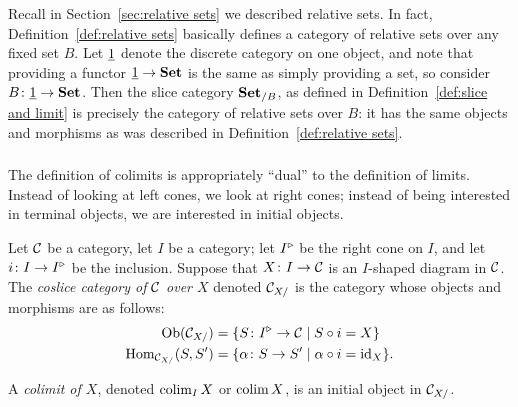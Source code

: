 \documentclass[CT4S-EN-RU]{subfiles}
\begin{document}
\begin{exampleRUS}\label{ex:product version of nat trans}
\end{exampleRUS}

\begin{remarkENG}
Recall in Section~\ref{sec:relative sets} we described relative sets. In fact, Definition~\ref{def:relative sets} basically defines a category of relative sets over any fixed set $B$. Let $\underline{1}$ denote the discrete category on one object, and note that providing a functor $\underline{1}\rightarrow{\mathbf{Set}}$ is the same as simply providing a set, so consider $B\colon\underline{1}\rightarrow{\mathbf{Set}}$. Then the slice category ${\mathbf{Set}}_{/B}$, as defined in Definition~\ref{def:slice and limit} is precisely the category of relative sets over $B$: it has the same objects and morphisms as was described in Definition~\ref{def:relative sets}.
\end{remarkENG}

\begin{remarkRUS}
\end{remarkRUS}


\subsubsection{}

\begin{blockENG}
The definition of colimits is appropriately “dual” to the definition of limits. Instead of looking at left cones, we look at right cones; instead of being interested in terminal objects, we are interested in initial objects.
\end{blockENG}

\begin{blockRUS}
\end{blockRUS}

\begin{definitionENG}\label{def:coslice and colimit}
Let $\mathcal{C}$ be a category, let $I$ be a category; let $I^\triangleright$ be the right cone on $I$, and let $i\colon I\rightarrow I^\triangleright$ be the inclusion. Suppose that $X\colon I\rightarrow\mathcal{C}$ is an $I$-shaped diagram in $\mathcal{C}$. The {\em coslice category of $\mathcal{C}$ over $X$} denoted $\mathcal{C}_{X/}$ is the category whose objects and morphisms are as follows:
\begin{align*}
\textnormal{Ob}(\mathcal{C}_{X/})&=\{S\colon I^\triangleright\rightarrow\mathcal{C}{\;|\;}S\circ i=X\}\\
\textnormal{Hom}_{\mathcal{C}_{X/}}(S,S')&=\{\alpha\colon S\rightarrow S'{\;|\;}\alpha\circ i=\textnormal{id}_X\}.
\end{align*}

A {\em colimit of $X$}, denoted $\mathop{\textnormal{colim}}_IX$ or $\mathop{\textnormal{colim}} X$, is an initial object in $\mathcal{C}_{X/}$.
\end{definitionENG}
\end{document}
